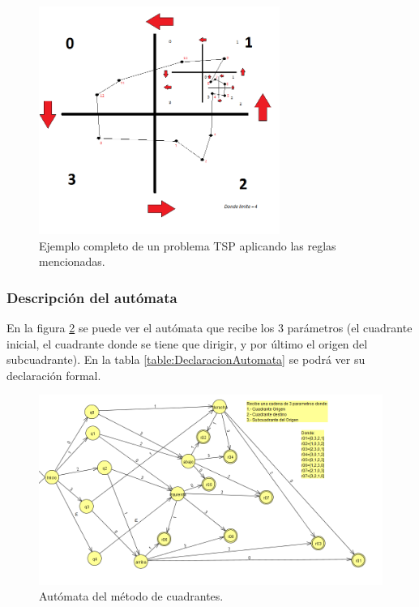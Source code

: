      \begin{figure}[hbt]
        \centering
            \includegraphics[width=0.7\textwidth]{MetodoRectanguloAureo/Imagenes/example.png}
            \caption{Ejemplo completo de un problema TSP aplicando las reglas mencionadas.}
            \label{fig:example.png}
    \end{figure}
    
\subsubsection{Descripción del autómata}    

En la figura \ref {fig:automata.png} se puede ver el autómata que recibe los 3 parámetros (el cuadrante inicial, el cuadrante donde se tiene que dirigir, y por último el origen del subcuadrante). En la tabla \ref{table:DeclaracionAutomata} se podrá ver su declaración formal.\\

    \begin{figure}[hbtp]
        \centering
            \includegraphics[width=1\textwidth]{MetodoRectanguloAureo/Imagenes/automata2_b.png}
            \caption{Autómata del método de cuadrantes.}
            \label{fig:automata.png}
    \end{figure}    

